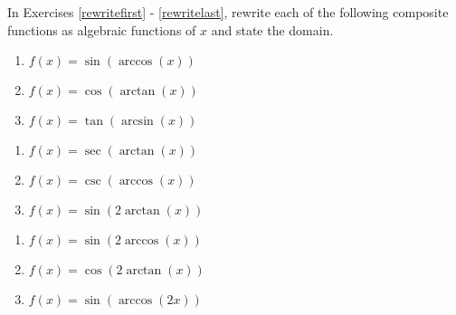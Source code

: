 In Exercises \ref{rewritefirst} - \ref{rewritelast}, rewrite each of the following composite functions as algebraic functions of $x$ and state the domain.
\begin{multicols}{3} 

\begin{enumerate}

\setcounter{enumi}{\value{HW}}

\item $f(x) = \sin \left( \arccos \left( x \right) \right)$ \label{rewritefirst}
\item $f(x) = \cos \left( \arctan \left( x \right) \right)$ 
\item $f(x) = \tan \left( \arcsin \left( x \right) \right)$ 

\setcounter{HW}{\value{enumi}}

\end{enumerate}

\end{multicols}

\begin{multicols}{3}

\begin{enumerate}

\setcounter{enumi}{\value{HW}}

\item $f(x) = \sec \left( \arctan \left( x \right) \right)$ 
\item $f(x) = \csc \left( \arccos \left( x \right) \right)$ 
\item$f(x) = \sin \left( 2\arctan \left( x \right) \right)$ 

\setcounter{HW}{\value{enumi}}

\end{enumerate}

\end{multicols}

\begin{multicols}{3}

\begin{enumerate}

\setcounter{enumi}{\value{HW}}

\item $f(x) = \sin \left( 2\arccos \left( x \right) \right)$ 
\item $f(x) = \cos \left( 2\arctan \left( x \right) \right)$ 
\item  $f(x) = \sin(\arccos(2x))$

\setcounter{HW}{\value{enumi}}

\end{enumerate}

\end{multicols}

